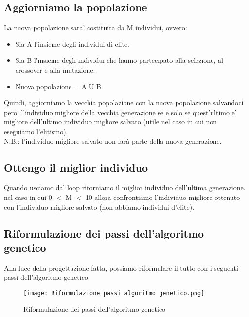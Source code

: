 \documentclass[10pt,a4paper]{article}
\begin{document}
    \subsection{Aggiorniamo la popolazione}
    \label{aggiorniamoPopolazioneSubsection}
    La nuova popolazione sara' costituita da M individui, ovvero:
    \begin{itemize}
      \item Sia A l'insieme degli individui di elite.
      \item Sia B l'insieme degli individui che hanno partecipato alla selezione, al crossover e alla mutazione.
      \item Nuova popolazione = A U B.
    \end{itemize}
    Quindi, aggiorniamo la vecchia popolazione con la nuova popolazione salvandoci pero' l'individuo 
    migliore della vecchia generazione se e solo se quest'ultimo e' migliore dell'ultimo individuo 
    migliore salvato (utile nel caso in cui non eseguiamo l'elitismo).\\
    N.B.: l'individuo migliore salvato non farà parte della nuova generazione.
    
    \subsection{Ottengo il miglior individuo}
    \label{ottengoMigliorIndividuoSubsection}
    Quando usciamo dal loop ritorniamo il miglior individuo dell'ultima generazione.\\
    nel caso in cui 0  $<$ M $<$ 10 allora confrontiamo l'individuo migliore ottenuto con l'individuo migliore salvato (non abbiamo individui d'elite).
    
    \subsection{Riformulazione dei passi dell'algoritmo genetico}
    \label{riformulazioneDeiPassiAlgoritmoGeneticoSubsection}
    Alla luce della progettazione fatta, possiamo riformulare il tutto con i seguenti passi 
    dell'algoritmo genetico: 
    \begin{figure}[h!]
      \centering
      \caption{Riformulazione dei passi dell'algoritmo genetico}
      \texttt{[image: Riformulazione passi algoritmo genetico.png]}
      \label{Riformulazione passi algoritmo genetico}
    \end{figure}
    
\end{document}
